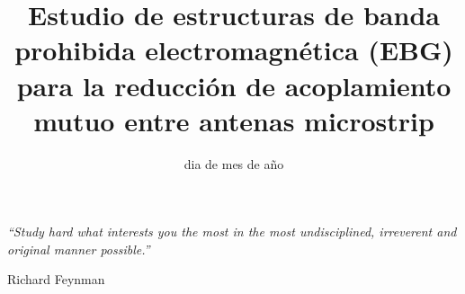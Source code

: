 \documentclass[a4paper, 11pt, twoside]{Thesis}  %
\begin{document}


\frontmatter  %

\title  {Estudio de estructuras de banda prohibida electromagnética (EBG) para la reducción de acoplamiento mutuo entre antenas microstrip}  %
\addresses  {\groupname\\\deptname\\\univname}  %
\date{dia de mes de año}  %
\subject{}
\keywords{}
\maketitle


\fancyhead{}  %
\rhead{\thepage}  %
\lhead{}  %




\pagestyle{empty}
\null\vfill
\textit{``Study hard what interests you the most in the most undisciplined, irreverent and original manner possible.''}
\begin{flushright}
Richard Feynman
\end{flushright}
\clearpage

\clearpage\pagestyle{empty}\mbox{}\clearpage  %




\pagestyle{empty}


\abstract

\lipsum[5]

\clearpage


\begin{center}
\bigskip
\end{center}
\end{document}
